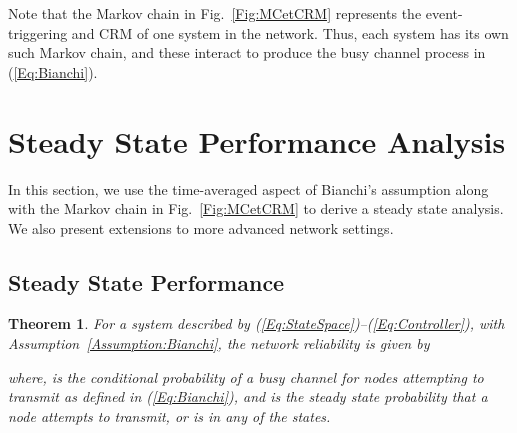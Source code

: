 \documentclass[journal]{IEEEtran}
\newtheorem{theorem}{Theorem}[section]
\begin{document}
Note that the Markov chain in Fig.~\ref{Fig:MCetCRM} represents the event-triggering and CRM of one system in the network. Thus, each system has its own such Markov chain, and these interact to produce the busy channel process in (\ref{Eq:Bianchi}).

\section{Steady State Performance Analysis} \label{S:SSanal}

In this section, we use the time-averaged aspect of Bianchi's assumption along with the Markov chain in Fig.~\ref{Fig:MCetCRM} to derive a steady state analysis. We also present extensions to more advanced network settings.

\subsection{Steady State Performance}
\begin{theorem} \label{Theorem:SteadyStateAnalysis}
For a system described by (\ref{Eq:StateSpace})--(\ref{Eq:Controller}), with Assumption~\ref{Assumption:Bianchi}, the network reliability is given by

where,  is the conditional probability of a busy channel for nodes attempting to transmit as defined in (\ref{Eq:Bianchi}), and  is the steady state probability that a node attempts to transmit, or is in any of the  states.
\end{theorem}
\end{document}

